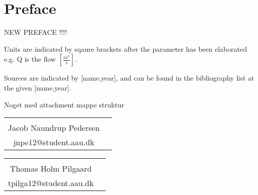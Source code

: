 \chapter*{Preface}
NEW PREFACE !!!!

Units are indicated by sqaure brackets after the parameter has been elaborated e.g. Q is the flow $\left[\frac{m^3}{s}\right]$. 

Sources are indicated by [name,year], and can be found in the bibliography list at the given
[name,year].

Noget med attachment mappe struktur

\vfill

\begin{table}[H]
	\centering
		\begin{tabular}{c c }
			\underline{\phantom{mmmmmmmmmmmmmmmmmmm}}       \\
			Jacob Naundrup Pedersen \\
			jnpe12@student.aau.dk \\


		\end{tabular}
				\begin{tabular}{c c }
			\underline{\phantom{mmmmmmmmmmmmmmmmmmm}}       \\
			Thomas Holm Pilgaard \\
			tpilga12@student.aau.dk\\

			
		\end{tabular}
		
\end{table}

